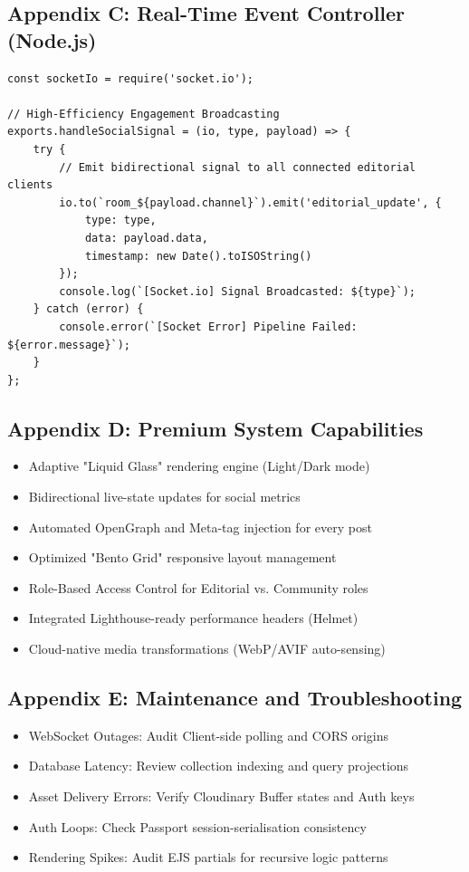 \documentclass[12pt,a4paper]{report}
\begin{document}
\subsection{Appendix C: Real-Time Event Controller (Node.js)}
\begin{verbatim}
const socketIo = require('socket.io');

// High-Efficiency Engagement Broadcasting
exports.handleSocialSignal = (io, type, payload) => {
    try {
        // Emit bidirectional signal to all connected editorial clients
        io.to(`room_${payload.channel}`).emit('editorial_update', {
            type: type,
            data: payload.data,
            timestamp: new Date().toISOString()
        });
        console.log(`[Socket.io] Signal Broadcasted: ${type}`);
    } catch (error) {
        console.error(`[Socket Error] Pipeline Failed: ${error.message}`);
    }
};
\end{verbatim}

\subsection{Appendix D: Premium System Capabilities}
\begin{itemize}
    \item Adaptive "Liquid Glass" rendering engine (Light/Dark mode)
    \item Bidirectional live-state updates for social metrics
    \item Automated OpenGraph and Meta-tag injection for every post
    \item Optimized "Bento Grid" responsive layout management
    \item Role-Based Access Control for Editorial vs. Community roles
    \item Integrated Lighthouse-ready performance headers (Helmet)
    \item Cloud-native media transformations (WebP/AVIF auto-sensing)
\end{itemize}

\subsection{Appendix E: Maintenance and Troubleshooting}
\begin{itemize}
    \item WebSocket Outages: Audit Client-side polling and CORS origins
    \item Database Latency: Review collection indexing and query projections
    \item Asset Delivery Errors: Verify Cloudinary Buffer states and Auth keys
    \item Auth Loops: Check Passport session-serialisation consistency
    \item Rendering Spikes: Audit EJS partials for recursive logic patterns
\end{itemize}
\end{document}
